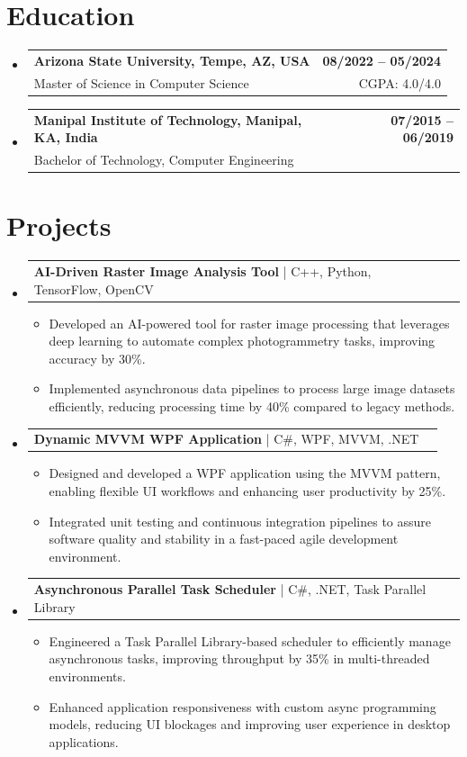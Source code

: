 \documentclass[letterpaper,11pt]{article}
\makeatletter
\newcommand{\resumeItem}[1]{
  \item\footnotesize{
    {#1 \vspace{-2pt}}
  }
}
\newcommand{\educationSubheading}[4]{
  \vspace{-2pt}\item
    \begin{tabular*}{1.0\textwidth}[t]{l@{\extracolsep{\fill}}r}
      \textbf{\small #1} & \textbf{\small #2} \\
      {\small#3} & {\small #4} \\
    \end{tabular*}\vspace{-7pt}
}
\newcommand{\resumeProjectHeading}[2]{
    \item
    \begin{tabular*}{1.001\textwidth}{l@{\extracolsep{\fill}}r}
      \small#1 & \textbf{\small #2}\\
    \end{tabular*}\vspace{-7pt}
}
\newcommand{\resumeSubHeadingListStart}{\begin{itemize}[leftmargin=0pt, label={}]}
\newcommand{\resumeSubHeadingListEnd}{\end{itemize}}
\newcommand{\resumeItemListStart}{\begin{itemize}[leftmargin=*]}
\newcommand{\resumeItemListEnd}{\end{itemize}\vspace{-5pt}}
\makeatother
\begin{document}
\section{Education}
  \resumeSubHeadingListStart
    \educationSubheading
      {Arizona State University, Tempe, AZ, USA}{08/2022 -- 05/2024}
      {Master of Science in Computer Science}{CGPA: 4.0/4.0}
    \educationSubheading
      {Manipal Institute of Technology, Manipal, KA, India}{07/2015 -- 06/2019}
      {Bachelor of Technology, Computer Engineering}{}
  \resumeSubHeadingListEnd

\section{Projects}
    \vspace{-5pt}
    \resumeSubHeadingListStart

      \resumeProjectHeading
          {\textbf{AI-Driven Raster Image Analysis Tool} | C++, Python, TensorFlow, OpenCV}{ }
        \resumeItemListStart
            \resumeItem{Developed an AI-powered tool for raster image processing that leverages deep learning to automate complex photogrammetry tasks, improving accuracy by 30\%.}
            \resumeItem{Implemented asynchronous data pipelines to process large image datasets efficiently, reducing processing time by 40\% compared to legacy methods.}
        \resumeItemListEnd
        \vspace{-12pt}

      \resumeProjectHeading
          {\textbf{Dynamic MVVM WPF Application} | C#, WPF, MVVM, .NET}{ }
        \resumeItemListStart
            \resumeItem{Designed and developed a WPF application using the MVVM pattern, enabling flexible UI workflows and enhancing user productivity by 25\%.}
            \resumeItem{Integrated unit testing and continuous integration pipelines to assure software quality and stability in a fast-paced agile development environment.}
        \resumeItemListEnd
        \vspace{-12pt}

      \resumeProjectHeading
          {\textbf{Asynchronous Parallel Task Scheduler} | C#, .NET, Task Parallel Library}{ }
        \resumeItemListStart
            \resumeItem{Engineered a Task Parallel Library-based scheduler to efficiently manage asynchronous tasks, improving throughput by 35\% in multi-threaded environments.}
            \resumeItem{Enhanced application responsiveness with custom async programming models, reducing UI blockages and improving user experience in desktop applications.}
        \resumeItemListEnd

    \resumeSubHeadingListEnd
\end{document}
